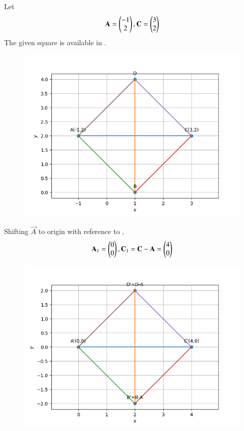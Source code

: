 Let
\begin{align}
\mathbf{A} = \begin{pmatrix}
-1 \\
 2\\
\end{pmatrix},
\mathbf{C} = 
\begin{pmatrix}
3\\
2\\
\end{pmatrix}
\end{align}
The given square is available in .
\begin{figure}[!ht]
	\begin{center} 
	    \includegraphics[width=\columnwidth]{chapters/10/7/4/4/figs/square}
	\end{center}
\caption{}
\label{fig:7/4/4/4Fig1}
\end{figure}
Shifting $\vec{A}$ to origin with reference to ,
\begin{align}
\mathbf{A}_1 =
\begin{pmatrix}
0 \\
0\\
\end{pmatrix},
\mathbf{C}_1 = \mathbf{C}-\mathbf{A} = 
\begin{pmatrix}
4 \\
0\\
\end{pmatrix}
\end{align}
\begin{figure}[!h]
	\begin{center} 
	    \includegraphics[width=\columnwidth]{chapters/10/7/4/4/figs/square1}
	\end{center}
\caption{}
\label{fig:7/4/4/4Fig2}
\end{figure}
